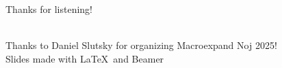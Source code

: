 \documentclass[aspectratio=169,11pt,xcolor=dvipsnames]{beamer}
\begin{document}
\begin{frame}
  \begin{center}
    \begin{huge}
      Thanks for listening!
    \end{huge}\\
    \vspace{24pt}
    Thanks to Daniel Slutsky for organizing Macroexpand Noj 2025!\\
    \vspace{24pt}
    Slides made with \LaTeX~and Beamer
  \end{center}
\end{frame}
\end{document}
